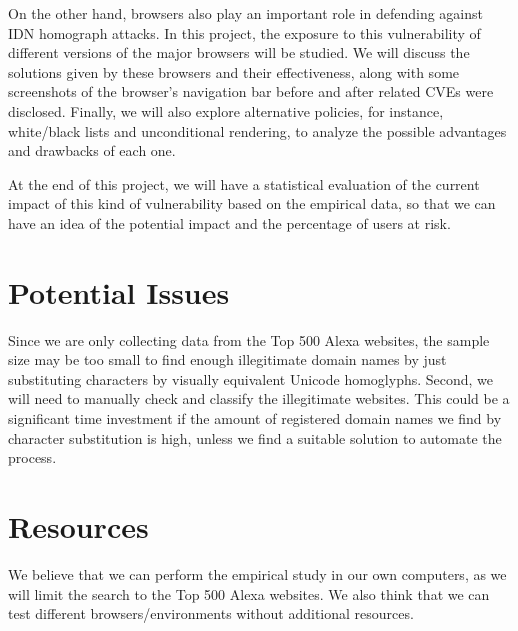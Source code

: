 \documentclass[letterpaper,twocolumn,10pt]{article}
\begin{document}
On the other hand, browsers also play an important role in defending against IDN homograph attacks.
In this project, the exposure to this vulnerability of different versions of the major browsers will be studied.
We will discuss the solutions given by these browsers and their effectiveness, along with some screenshots of the browser's navigation bar before and after related CVEs were disclosed.
Finally, we will also explore alternative policies, for instance, white/black lists and unconditional rendering, to analyze the possible advantages and drawbacks of each one.

At the end of this project, we will have a statistical evaluation of the current impact of this kind of vulnerability based on the empirical data, so that we can have an idea of the potential impact and the percentage of users at risk.

\section{Potential Issues}
Since we are only collecting data from the Top 500 Alexa websites, the sample size may be too small to find enough illegitimate domain names by just substituting characters by visually equivalent Unicode homoglyphs.
Second, we will need to manually check and classify the illegitimate websites.
This could be a significant time investment if the amount of registered domain names we find by character substitution is high, unless we find a suitable solution to automate the process.

\section{Resources}
We believe that we can perform the empirical study in our own computers, as we will limit the search to the Top 500 Alexa websites.
We also think that we can test different browsers/environments without additional resources.
\end{document}

